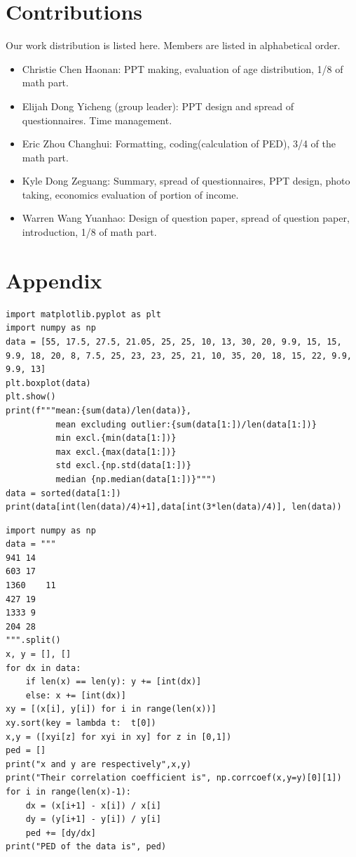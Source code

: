 \documentclass[a4paper]{article}
\begin{document}

\section{Contributions}

Our work distribution is listed here. Members are listed in alphabetical order.

\begin{itemize}
    \item Christie Chen Haonan: PPT making, evaluation of age distribution, 1/8 of math part.
    \item Elijah Dong Yicheng (group leader): PPT design and spread of questionnaires. Time management.
    \item Eric Zhou Changhui: Formatting, coding(calculation of PED), 3/4 of the math part.
    \item Kyle Dong Zeguang: Summary, spread of questionnaires, PPT design, photo taking, economics evaluation of portion of income.
    \item Warren Wang Yuanhao: Design of question paper, spread of question paper, introduction, 1/8 of math part.
\end{itemize}

\clearpage

\section*{Appendix}

\linespread{1}

\begin{lstlisting}[style = Python, caption={One variable analysis code}, label= code.1]
import matplotlib.pyplot as plt
import numpy as np
data = [55, 17.5, 27.5, 21.05, 25, 25, 10, 13, 30, 20, 9.9, 15, 15, 9.9, 18, 20, 8, 7.5, 25, 23, 23, 25, 21, 10, 35, 20, 18, 15, 22, 9.9, 9.9, 13]
plt.boxplot(data)
plt.show()
print(f"""mean:{sum(data)/len(data)},
          mean excluding outlier:{sum(data[1:])/len(data[1:])}
          min excl.{min(data[1:])}
          max excl.{max(data[1:])}
          std excl.{np.std(data[1:])}
          median {np.median(data[1:])}""")
data = sorted(data[1:])
print(data[int(len(data)/4)+1],data[int(3*len(data)/4)], len(data))
\end{lstlisting}

\begin{lstlisting}[style = Python, caption={Two variable analysis code}, label = code.2]
import numpy as np
data = """
941 14
603 17
1360    11
427 19
1333 9
204 28
""".split()
x, y = [], []
for dx in data:
    if len(x) == len(y): y += [int(dx)]
    else: x += [int(dx)]
xy = [(x[i], y[i]) for i in range(len(x))]
xy.sort(key = lambda t:  t[0])
x,y = ([xyi[z] for xyi in xy] for z in [0,1])
ped = []
print("x and y are respectively",x,y)
print("Their correlation coefficient is", np.corrcoef(x,y=y)[0][1])
for i in range(len(x)-1):
    dx = (x[i+1] - x[i]) / x[i]
    dy = (y[i+1] - y[i]) / y[i]
    ped += [dy/dx]
print("PED of the data is", ped)
\end{lstlisting}



\end{document}
